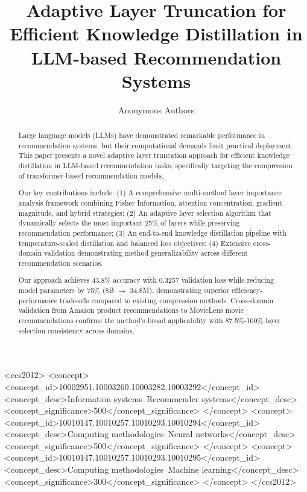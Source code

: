 \documentclass[sigconf]{acmart}
\title{Adaptive Layer Truncation for Efficient Knowledge Distillation in LLM-based Recommendation Systems}
\author{Anonymous Authors}
\affiliation{%
  \institution{Anonymous Institution}
  \city{Anonymous City}
  \country{Anonymous Country}
}
\begin{document}
\begin{abstract}
Large language models (LLMs) have demonstrated remarkable performance in recommendation systems, but their computational demands limit practical deployment. This paper presents a novel adaptive layer truncation approach for efficient knowledge distillation in LLM-based recommendation tasks, specifically targeting the compression of transformer-based recommendation models.

Our key contributions include: (1) A comprehensive multi-method layer importance analysis framework combining Fisher Information, attention concentration, gradient magnitude, and hybrid strategies; (2) An adaptive layer selection algorithm that dynamically selects the most important 25\% of layers while preserving recommendation performance; (3) An end-to-end knowledge distillation pipeline with temperature-scaled distillation and balanced loss objectives; (4) Extensive cross-domain validation demonstrating method generalizability across different recommendation scenarios.

Our approach achieves 43.8\% accuracy with 0.3257 validation loss while reducing model parameters by 75\% (8B $\rightarrow$ 34.8M), demonstrating superior efficiency-performance trade-offs compared to existing compression methods. Cross-domain validation from Amazon product recommendations to MovieLens movie recommendations confirms the method's broad applicability with 87.5\%-100\% layer selection consistency across domains.
\end{abstract}

\begin{CCSXML}
<ccs2012>
<concept>
<concept_id>10002951.10003260.10003282.10003292</concept_id>
<concept_desc>Information systems~Recommender systems</concept_desc>
<concept_significance>500</concept_significance>
</concept>
<concept>
<concept_id>10010147.10010257.10010293.10010294</concept_id>
<concept_desc>Computing methodologies~Neural networks</concept_desc>
<concept_significance>500</concept_significance>
</concept>
<concept>
<concept_id>10010147.10010257.10010293.10010295</concept_id>
<concept_desc>Computing methodologies~Machine learning</concept_desc>
<concept_significance>300</concept_significance>
</concept>
</ccs2012>
\end{CCSXML}


\end{document}
